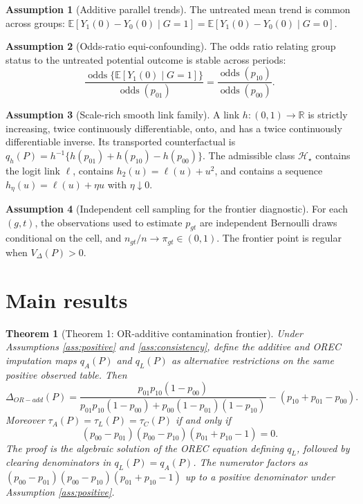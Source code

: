 \documentclass[11pt]{article}
\newcommand{\E}{\mathbb{E}}
\theoremstyle{definition}
\newtheorem{assumption}{Assumption}
\theoremstyle{plain}
\newtheorem{theorem}{Theorem}
\theoremstyle{remark}
\begin{document}
\begin{assumption}[Additive parallel trends]\label{ass:additive}
The untreated mean trend is common across groups: \(\E[Y_1(0)-Y_0(0)\mid G=1]=\E[Y_1(0)-Y_0(0)\mid G=0]\).
\end{assumption}

\begin{assumption}[Odds-ratio equi-confounding]\label{ass:orec}
The odds ratio relating group status to the untreated potential outcome is stable across periods:
\[
\frac{\operatorname{odds}\{\E[Y_1(0)\mid G=1]\}}{\operatorname{odds}(p_{01})}
=
\frac{\operatorname{odds}(p_{10})}{\operatorname{odds}(p_{00})}.
\]
\end{assumption}

\begin{assumption}[Scale-rich smooth link family]\label{ass:links}
A link \(h:(0,1)\to\mathbb R\) is strictly increasing, twice continuously differentiable, onto, and has a twice continuously differentiable inverse.  Its transported counterfactual is \(q_h(P)=h^{-1}\{h(p_{01})+h(p_{10})-h(p_{00})\}\).  The admissible class \(\mathcal H_\star\) contains the logit link \(\ell\), contains \(h_2(u)=\ell(u)+u^2\), and contains a sequence \(h_{\eta}(u)=\ell(u)+\eta u\) with \(\eta\downarrow0\).
\end{assumption}

\begin{assumption}[Independent cell sampling for the frontier diagnostic]\label{ass:sampling}
For each \((g,t)\), the observations used to estimate \(p_{gt}\) are independent Bernoulli draws conditional on the cell, and \(n_{gt}/n\to\pi_{gt}\in(0,1)\).  The frontier point is regular when \(V_\Delta(P)>0\).
\end{assumption}

\section{Main results}
\begin{theorem}[Theorem 1: OR-additive contamination frontier]\label{thm:frontier}
Under Assumptions \ref{ass:positive} and \ref{ass:consistency}, define the additive and OREC imputation maps \(q_A(P)\) and \(q_L(P)\) as alternative restrictions on the same positive observed table.  Then
\[
\Delta_{OR-add}(P)=
\frac{p_{01}p_{10}(1-p_{00})}{p_{01}p_{10}(1-p_{00})+p_{00}(1-p_{01})(1-p_{10})}
-(p_{10}+p_{01}-p_{00}).
\]
Moreover \(\tau_A(P)=\tau_L(P)=\tau_C(P)\) if and only if
\[
(p_{00}-p_{01})(p_{00}-p_{10})(p_{01}+p_{10}-1)=0.
\]
The proof is the algebraic solution of the OREC equation defining \(q_L\), followed by clearing denominators in \(q_L(P)=q_A(P)\).  The numerator factors as \((p_{00}-p_{01})(p_{00}-p_{10})(p_{01}+p_{10}-1)\) up to a positive denominator under Assumption \ref{ass:positive}.
\end{theorem}
\end{document}
